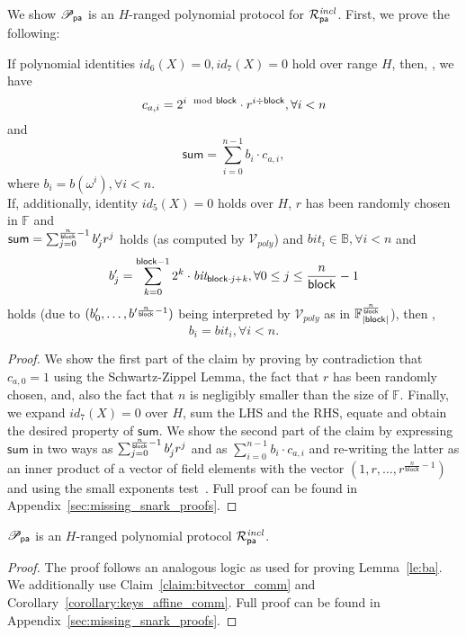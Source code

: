 \noindent We show $\mathscr{P}_{\mathsf{pa}}$ is an $H$-ranged polynomial protocol 
for $\mathcal{R}^{\mathit{incl}}_{\mathsf{pa}}$. First, we prove the following:

\begin{test_claim}
\label{claim:bitvector_comm}
If polynomial identities $id_6(X) = 0, id_7(X) = 0$ hold over range $H$, then, 
\ewnp,  we have $$c_{a,i} =  2^{i \mod {\mathsf{block}}} \cdot r^{i \div \mathsf{block}}, \forall i < n$$ and $$\mathsf{sum} = \sum_{i=0}^{n-1}b_i \cdot c_{a,i},$$  
where $b_i = b(\omega^i), \forall i <n$. \\

\noindent If, additionally, identity $id_5(X) = 0$ holds over $H$, 
$r$ has been randomly chosen in $\mathbb{F}$ and \\ $\mathsf{sum} = \sum_{j=0}^{\frac{n}{\mathsf{block}}-1} b'_{j}r^j$ 
holds (as computed by $\mathcal{V}_{poly}$) and $\mathit{bit_{i}} \in \mathbb{B}, \forall i < n$ and 
$$b'_{j} = \sum_{k=0}^{\mathsf{block} -1}2^k \cdot \mathit{bit_{\mathsf{block} \cdot j + k}}, \forall 0 \leq j \leq \frac{n}{\mathsf{block}} -1$$  holds (due to $(b'_{0}, \ldots, b'^{\frac{n}{\mathsf{block}} -1})$ 
being interpreted by $\mathcal{V}_{poly}$ as in $\mathbb{F}_{|\mathsf{block}|}^{\frac{n}{\mathsf{block}}}$), then \ewnp, 
$$b_i = \mathit{bit_{i}}, \forall i <n.$$
\end{test_claim}
\vspace{-0.15in}

\begin{proof}
We show the first part of the claim by proving by contradiction that $c_{a,0} =1$ using the Schwartz-Zippel Lemma, the fact that $r$ has been 
randomly chosen, and, also the fact that $n$ is negligibly smaller than the size of $\mathbb{F}$. Finally, we expand $\mathit{id_7}(X) = 0$ 
over $H$, sum the LHS and the RHS, equate and obtain the desired property of $\mathsf{sum}$. We show the second part of 
the claim by expressing $\mathsf{sum}$ in two ways as $\sum_{j=0}^{\frac{n}{\mathsf{block}}-1} b'_{j}r^j $ and as $\sum_{i=0}^{n-1} b_i \cdot c_{a,i}$ and re-writing the 
latter as an inner product of a vector of field elements with the vector $(1, r, \ldots, r^{\frac{n}{\mathsf{block}}-1})$ and using the small exponents test~\cite{small_exponents}. 
Full proof can be found in Appendix~\ref{sec:missing_snark_proofs}.
\end{proof}
\vspace{-0.1in}

\begin{lemma} 
$\mathscr{P}_{\mathsf{pa}}$ is an $H$-ranged polynomial protocol $\mathcal{R}^{\mathit{incl}}_{\mathsf{pa}}$.
\end{lemma}
\vspace{-0.15in}

\begin{proof} 
The proof follows an analogous logic as used for proving Lemma~\ref{le:ba}. We additionally use 
Claim~\ref{claim:bitvector_comm} and Corollary~\ref{corollary:keys_affine_comm}. Full proof can be found in Appendix~\ref{sec:missing_snark_proofs}.
\end{proof}
\vspace{-0.15in}
